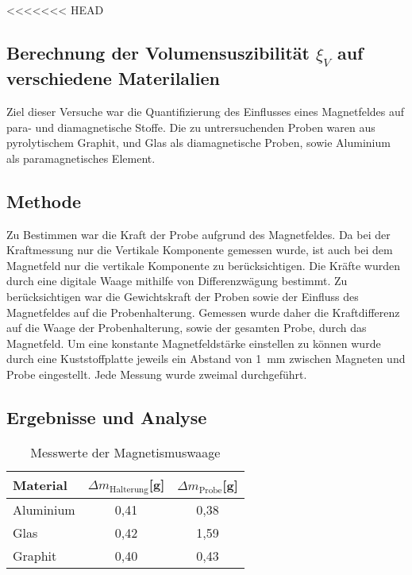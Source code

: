 <<<<<<< HEAD
\subsection{Berechnung der Volumensuszibilität $\xi_V$ auf verschiedene Materilalien}
Ziel dieser Versuche war die Quantifizierung des Einflusses eines Magnetfeldes auf para- und diamagnetische Stoffe. Die zu untrersuchenden Proben waren aus pyrolytischem Graphit, und Glas als diamagnetische Proben, sowie Aluminium als paramagnetisches Element.\\
\subsection{Methode}
Zu Bestimmen war die Kraft der Probe aufgrund des Magnetfeldes. Da bei der Kraftmessung nur die Vertikale Komponente gemessen wurde, ist auch bei dem Magnetfeld nur die vertikale Komponente zu berücksichtigen. Die Kräfte wurden durch eine digitale Waage mithilfe von Differenzwägung bestimmt.
 Zu berücksichtigen war die Gewichtskraft der Proben sowie der Einfluss des Magnetfeldes auf die Probenhalterung.
 Gemessen wurde daher die Kraftdifferenz auf die Waage der Probenhalterung, sowie der gesamten Probe, durch das Magnetfeld.
Um eine konstante Magnetfeldstärke einstellen zu können wurde durch eine Kuststoffplatte jeweils ein Abstand von \SI{1}{mm} zwischen Magneten und Probe eingestellt. Jede Messung wurde zweimal durchgeführt.

\subsection{Ergebnisse und Analyse}


\begin{table}
\caption{Messwerte der Magnetismuswaage}
\begin{center}
	

\begin{tabular}{|l|c|c|}

\hline
Material&$\Delta m_{\textrm{Halterung}}$[g]&$\Delta m_{\textrm{Probe}}$[g]\\
\hline
Aluminium &0,41&0,38\\
\hline
Glas&0,42&1,59
\\ \hline
Graphit&0,40&0,43
\\ \hline

\end{tabular}
\end{center}
\label{vsus}

\end{table}

